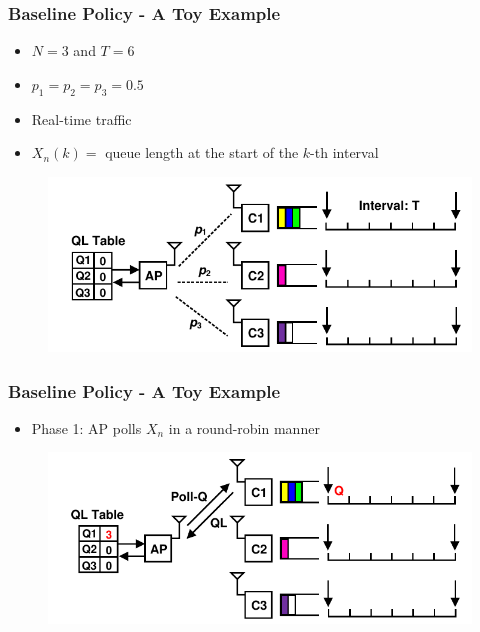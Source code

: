 \documentclass{beamer}
\begin{document}
\begin{frame}
\frametitle{Baseline Policy - A Toy Example}
\begin{itemize}
\item $N=3$ and $T=6$
\item $p_1 = p_2 = p_3 = 0.5$
\item Real-time traffic
\item $X_n(k) =$ queue length at the start of the $k$-th interval 
\end{itemize}
\begin{figure}
\centering
\includegraphics[scale=0.8]{network.pdf}
\end{figure}
\end{frame}

\begin{frame}
\frametitle{Baseline Policy - A Toy Example}
\begin{itemize}
\item Phase 1: AP polls $X_n$ in a round-robin manner
\end{itemize}
\begin{figure}
\centering
\includegraphics[scale=0.8]{animation_01.pdf}
\end{figure}
\end{frame}
\end{document}
